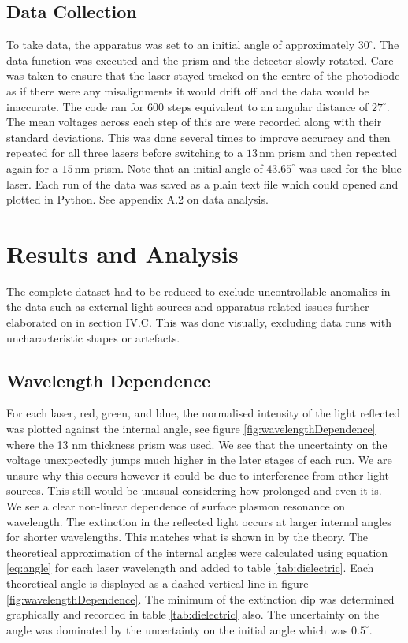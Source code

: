 \documentclass[%
reprint,
amsmath,amssymb,
aps,
]{revtex4-2}
\begin{document}
		\subsection{Data Collection}
			To take data, the apparatus was set to an initial angle of approximately $30^\circ$. The data function was executed and the prism and the detector slowly rotated. Care was taken to ensure that the laser stayed tracked on the centre of the photodiode as if there were any misalignments it would drift off and the data would be inaccurate. The code ran for $600$ steps equivalent to an angular distance of $27^\circ$. The mean voltages across each step of this arc were recorded along with their standard deviations. This was done several times to improve accuracy and then repeated for all three lasers before switching to a $13\,\text{nm}$ prism and then repeated again for a $15\,\text{nm}$ prism. Note that an initial angle of $43.65^\circ$ was used for the blue laser. Each run of the data was saved as a plain text file which could opened and plotted in Python. See appendix A.2 on data analysis.
		
		
	
	\section{Results and Analysis}
		The complete dataset had to be reduced to exclude uncontrollable anomalies in the data such as external light sources and apparatus related issues further elaborated on in section IV.C. This was done visually, excluding data runs with uncharacteristic shapes or artefacts.
		
		\subsection{Wavelength Dependence}
		
			For each laser, red, green, and blue, the normalised intensity of the light reflected was plotted against the internal angle, see figure \ref{fig:wavelengthDependence} where the 13 nm thickness prism was used. We see that the uncertainty on the voltage unexpectedly jumps much higher in the later stages of each run. We are unsure why this occurs however it could be due to interference from other light sources. This still would be unusual considering how prolonged and even it is. \\
			
			We see a clear non-linear dependence of surface plasmon resonance on wavelength. The extinction in the reflected light occurs at larger internal angles for shorter wavelengths. This matches what is shown in by the theory. The theoretical approximation of the internal angles were calculated using equation \ref{eq:angle} for each laser wavelength and added to table \ref{tab:dielectric}. Each theoretical angle is displayed as a dashed vertical line in figure \ref{fig:wavelengthDependence}. The minimum of the extinction dip was determined graphically and recorded in table \ref{tab:dielectric} also. The uncertainty on the angle was dominated by the uncertainty on the initial angle which was $0.5^\circ$.
			
\end{document}
